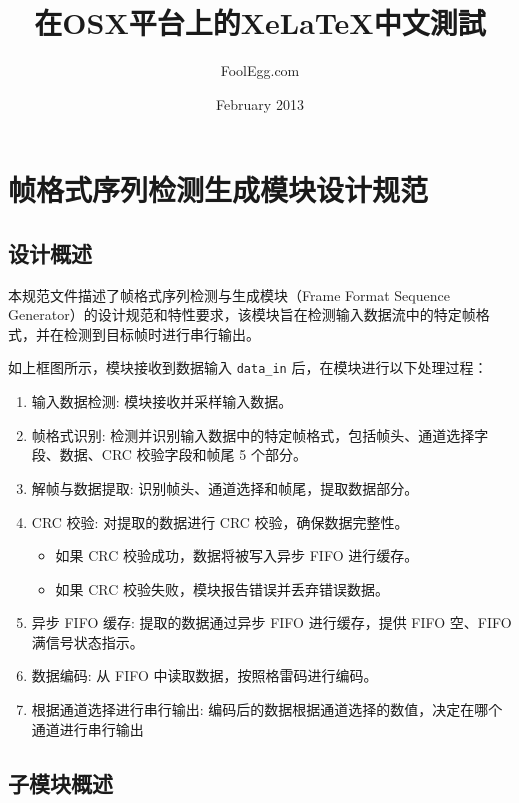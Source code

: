 \documentclass[12pt,]{article}
\title{\huge 在OSX平台上的XeLaTeX中文測試} %
\author{FoolEgg.com} 		%
\date{February 2013} 		%
\author{}
\date{}
\begin{document}
\hypertarget{ux5e27ux683cux5f0fux5e8fux5217ux68c0ux6d4bux751fux6210ux6a21ux5757ux8bbeux8ba1ux89c4ux8303}{%
\section{帧格式序列检测生成模块设计规范}\label{ux5e27ux683cux5f0fux5e8fux5217ux68c0ux6d4bux751fux6210ux6a21ux5757ux8bbeux8ba1ux89c4ux8303}}

\tableofcontents


\hypertarget{ux8bbeux8ba1ux6982ux8ff0}{%
\subsection{设计概述}\label{ux8bbeux8ba1ux6982ux8ff0}}

本规范文件描述了帧格式序列检测与生成模块（Frame Format Sequence
Generator）的设计规范和特性要求，该模块旨在检测输入数据流中的特定帧格式，并在检测到目标帧时进行串行输出。

如上框图所示，模块接收到数据输入 \texttt{data\_in}
后，在模块进行以下处理过程：

\begin{enumerate}
\def\labelenumi{\arabic{enumi}.}
\item
  输入数据检测: 模块接收并采样输入数据。
\item
  帧格式识别:
  检测并识别输入数据中的特定帧格式，包括帧头、通道选择字段、数据、CRC
  校验字段和帧尾 5 个部分。
\item
  解帧与数据提取: 识别帧头、通道选择和帧尾，提取数据部分。
\item
  CRC 校验: 对提取的数据进行 CRC 校验，确保数据完整性。

  \begin{itemize}
  \item
    如果 CRC 校验成功，数据将被写入异步 FIFO 进行缓存。
  \item
    如果 CRC 校验失败，模块报告错误并丢弃错误数据。
  \end{itemize}
\item
  异步 FIFO 缓存: 提取的数据通过异步 FIFO 进行缓存，提供 FIFO 空、FIFO
  满信号状态指示。
\item
  数据编码: 从 FIFO 中读取数据，按照格雷码进行编码。
\item
  根据通道选择进行串行输出:
  编码后的数据根据通道选择的数值，决定在哪个通道进行串行输出
\end{enumerate}

\hypertarget{ux5b50ux6a21ux5757ux6982ux8ff0}{%
\subsection{子模块概述}\label{ux5b50ux6a21ux5757ux6982ux8ff0}}
\end{document}
